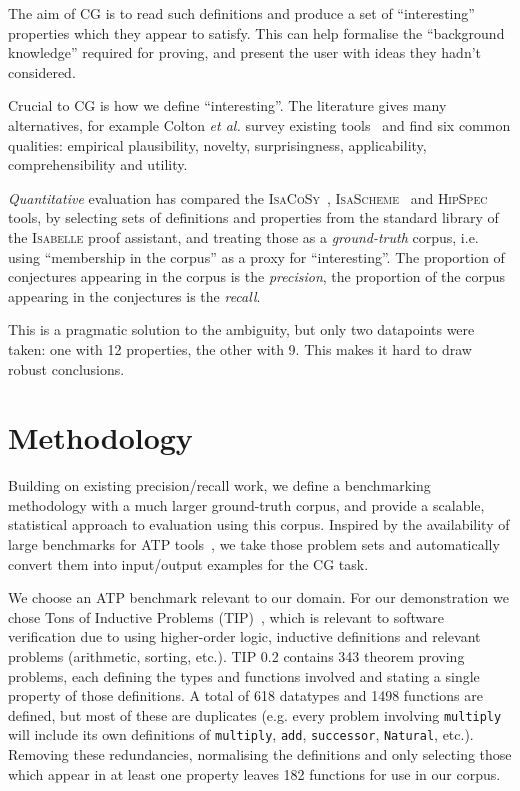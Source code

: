 \documentclass[]{default}
\newcommand{\etal}{{\em et al.}}
\begin{document}
The aim of CG is to read such definitions and produce a set of ``interesting''
properties which they appear to satisfy. This can help formalise the
``background knowledge'' required for proving, and present the user with ideas
they hadn't considered.

Crucial to CG is how we define ``interesting''. The literature gives many
alternatives, for example Colton \etal{} survey existing
tools~\cite{colton2000notion} and find six common qualities: empirical
plausibility, novelty, surprisingness, applicability, comprehensibility and
utility.

\emph{Quantitative} evaluation has compared the
\textsc{IsaCoSy}~\cite{Johansson.Dixon.Bundy:conjecture-generation},
\textsc{IsaScheme}~\cite{Montano-Rivas.McCasland.Dixon.ea:2012} and
\textsc{HipSpec}~\cite{claessen2013automating} tools, by selecting sets of
definitions and properties from the standard library of the \textsc{Isabelle}
proof assistant, and treating those as a \emph{ground-truth} corpus, i.e. using
``membership in the corpus'' as a proxy for ``interesting''. The proportion of
conjectures appearing in the corpus is the \emph{precision}, the proportion of
the corpus appearing in the conjectures is the \emph{recall}.

This is a pragmatic solution to the ambiguity, but only two datapoints were
taken: one with 12 properties, the other with 9. This makes it hard to draw
robust conclusions.

\section{Methodology}

Building on existing precision/recall work, we define a benchmarking methodology
with a much larger ground-truth corpus, and provide a scalable, statistical
approach to evaluation using this corpus. Inspired by the availability of large
benchmarks for ATP tools~\cite{pelletier2002development}, we take those problem
sets and automatically convert them into input/output examples for the CG task.

We choose an ATP benchmark relevant to our domain. For our demonstration we
chose Tons of Inductive Problems (TIP)~\cite{claessen2015tip}, which is relevant
to software verification due to using higher-order logic, inductive definitions
and relevant problems (arithmetic, sorting, etc.). TIP 0.2 contains 343 theorem
proving problems, each defining the types and functions involved and stating a
single property of those definitions. A total of 618 datatypes and 1498
functions are defined, but most of these are duplicates (e.g. every problem
involving \texttt{multiply} will include its own definitions of
\texttt{multiply}, \texttt{add}, \texttt{successor}, \texttt{Natural}, etc.).
Removing these redundancies, normalising the definitions and only selecting
those which appear in at least one property leaves 182 functions for use in our
corpus.
\end{document}
